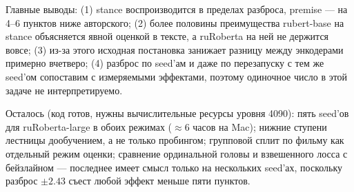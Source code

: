 \documentclass{article}
\begin{document}
Главные выводы: (1) stance воспроизводится в пределах разброса, premise --- на 4--6 пунктов
ниже авторского; (2) более половины преимущества rubert-base на stance объясняется явной
оценкой в тексте, а ruRoberta на ней не держится вовсе; (3) из-за этого исходная постановка
занижает разницу между энкодерами примерно вчетверо; (4) разброс по seed'ам и даже
по перезапуску с тем же seed'ом сопоставим с измеряемыми эффектами, поэтому одиночное
число в этой задаче не интерпретируемо.

Осталось (код готов, нужны вычислительные ресурсы уровня 4090): пять seed'ов для
ruRoberta-large в обоих режимах ($\approx 6$ часов на Mac); нижние ступени лестницы
дообучением, а не только пробингом; групповой сплит по фильму как отдельный режим оценки;
сравнение ординальной головы и взвешенного лосса с бейзлайном --- последнее имеет смысл
только на нескольких seed'ах, поскольку разброс $\pm 2.43$ съест любой эффект меньше
пяти пунктов.



\end{document}
